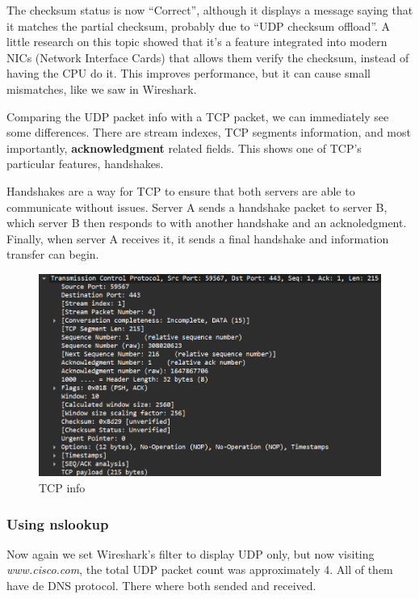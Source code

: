 The checksum status is now ``Correct'', although it displays a message saying
that it matches the partial checksum, probably due to ``UDP checksum offload''.
A little research on this topic showed that it's a feature integrated into
modern NICs (Network Interface Cards) that allows them verify the checksum,
instead of having the CPU do it. This improves performance, but it can cause
small mismatches, like we saw in Wireshark.

Comparing the UDP packet info with a TCP packet, we can immediately see some
differences. There are stream indexes, TCP segments information, and most
importantly, \textbf{acknowledgment} related fields. This shows one of TCP's
particular features, handshakes.

Handshakes are a way for TCP to ensure that both servers are able to
communicate without issues. Server A sends a handshake packet to server B,
which server B then responds to with another handshake and an acknoledgment.
Finally, when server A receives it, it sends a final handshake and information
transfer can begin.

\begin{figure}[htbp]
	\centering
	\includegraphics[width=1\linewidth]{img/6.png}
	\caption{TCP info}\label{fig:6}
\end{figure}

\subsubsection{Using nslookup}

Now again we set Wireshark's filter to display UDP only, but now visiting
\textit{www.cisco.com}, the total UDP packet count was approximately 4. All of
them have de DNS protocol. There where both sended and received.\@

